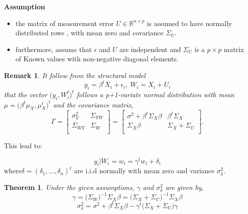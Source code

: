 \documentclass[12pt]{report}
\newtheorem{theoreme}{Theorem}[section] %
\newtheorem{remarque}{Remark}[section]
\begin{document}
\textbf{Assumption}
\begin{itemize}
	\item the matrix of measurement error $U \in \mathbb{R}^{n\times p}$ is assumed to have normally distributed rows , with mean zero and covariance $\Sigma_{U}$. 
	\item furthermore, assume that $\epsilon$ and $U$ are independent and  $\Sigma_{U}$ is a $p\times p$ matrix of Known values with non-negative diagonal elements.
\end{itemize}
\begin{remarque}
	It follow from the structural model
	\begin{equation}
		y_{i}=\beta^{t}X_{i}+\epsilon_{i},\ W_{i}=X_{i}+U_{i}
		\label{f47}
	\end{equation} that the vector $\big(y_{i},W_{i}^{t}\big)^{t}$ follows a p+1-variate normal distribution with mean $\mu= \big(\beta^{t}\mu_{X},\mu_{X}^{t}\big)^{t}$ and the covariance matrix,
	\begin{equation}
		\Gamma=\begin{bmatrix}
			\sigma^{2}_{Y}& \Sigma_{YW} \\
			\Sigma_{WY} &\Sigma_{W} \\
		\end{bmatrix} =\begin{bmatrix}
			\sigma^{2}+\beta^{t}\Sigma_{X}\beta& \beta^{t}\Sigma_{X} \\
			\Sigma_{X}\beta &\Sigma_{X}+ \Sigma_{U}\\
		\end{bmatrix}.
		\label{f48}
	\end{equation}
\end{remarque}
This lead to:

\begin{equation}
	y_{i}|W_{i}=w_{i}=\gamma^{t}w_{i}+\delta_{i}
	\label{f49}
\end{equation}
where$\delta=(\delta_{1},\dots,\delta_{n})^{t}$ are i.i.d normally with mean zero and variance $\sigma^{2}_{\delta}$.
\begin{theoreme}
	Under the given assumptions, $\gamma$ and $\sigma_{\delta}^{2}$ are given by,
	\begin{equation}
		\gamma=\big(\Sigma_{W}\big)^{-1}\Sigma_{X}\beta=\big(\Sigma_{X}+\Sigma_{U}\big)^{-1}\Sigma_{X}\beta
		\label{gam}
	\end{equation}
	\begin{equation}
		\sigma_{\delta}^{2}= \sigma^{2}+\beta^{t}\Sigma_{X}\beta-\gamma^{t}\big(\Sigma_{X}+\Sigma_{U}\big)\gamma
	\end{equation}
\end{theoreme}
\end{document}
